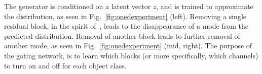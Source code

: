 The generator is conditioned on a latent vector $z$, and is trained to approximate the distribution, as seen in Fig.~\ref{fig:onedexperiment} (left). 
Removing a single residual block, in the spirit of~\cite{veit2016residual}, leads to the disappearance of a mode from the predicted distribution. 
Removal of another block leads to further removal of another mode, as seen in Fig.~\ref{fig:onedexperiment}  (mid, right). 
The purpose of the gating network, is to learn which blocks (or more specifically, which channels) to turn on and off for each object class.



\begin{figure}[t]%
\centering
{}
\end{figure}
